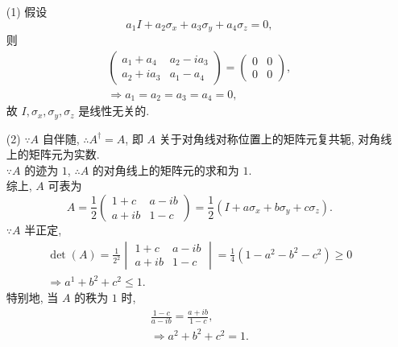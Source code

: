 \documentclass{assignment}
\begin{document}
\begin{pf}
    \begin{itemize}
        \item[(1)] 假设
        \[
            a_1I+a_2\sigma_x+a_3\sigma_y+a_4\sigma_z=0,
        \]
        则
        \begin{gather*}
            \begin{pmatrix}
                a_1+a_4&a_2-ia_3\\
                a_2+ia_3&a_1-a_4
            \end{pmatrix}=\begin{pmatrix}
                0&0\\
                0&0
            \end{pmatrix},\\
            \Longrightarrow a_1=a_2=a_3=a_4=0,
        \end{gather*}
        故 $I,\sigma_x,\sigma_y,\sigma_z$ 是线性无关的.
        \item[(2)] $\because A$ 自伴随, $\therefore A^{\dagger}=A$, 即 $A$ 关于对角线对称位置上的矩阵元复共轭, 对角线上的矩阵元为实数.\\
        $\because A$ 的迹为 $1$, $\therefore A$ 的对角线上的矩阵元的求和为 $1$.\\
        综上, $A$ 可表为
        \[
            A=\frac{1}{2}\begin{pmatrix}
                1+c&a-ib\\
                a+ib&1-c
            \end{pmatrix}=\frac{1}{2}(I+a\sigma_x+b\sigma_y+c\sigma_z).
        \]
        $\because A$ 半正定,
        \begin{gather*}
            \det(A)=\frac{1}{2^2}\begin{vmatrix}
                1+c&a-ib\\
                a+ib&1-c
            \end{vmatrix}=\frac{1}{4}(1-a^2-b^2-c^2)\geq 0\\
            \Longrightarrow a^1+b^2+c^2\leq 1.
        \end{gather*}
        特别地, 当 $A$ 的秩为 $1$ 时,
        \begin{gather}
            \frac{1-c}{a-ib}=\frac{a+ib}{1-c},\\
            \Longrightarrow a^2+b^2+c^2=1.
        \end{gather}
    \end{itemize}
\end{pf}
\end{document}
